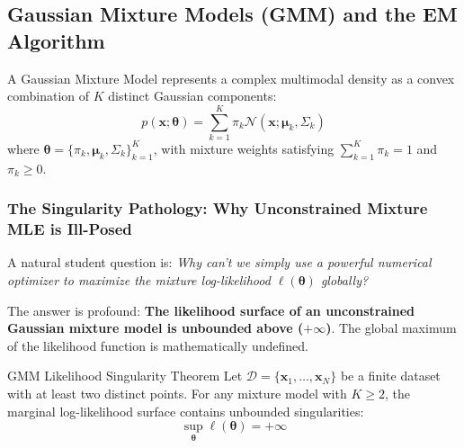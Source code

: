 \subsection{Gaussian Mixture Models (GMM) and the EM Algorithm}
A Gaussian Mixture Model represents a complex multimodal density as a convex combination of $K$ distinct Gaussian components:
\begin{equation}
p(\mathbf{x}; \boldsymbol{\theta}) = \sum_{k=1}^K \pi_k \mathcal{N}(\mathbf{x}; \boldsymbol{\mu}_k, \Sigma_k)
\label{eq:gmm_density}
\end{equation}
where $\boldsymbol{\theta} = \{\pi_k, \boldsymbol{\mu}_k, \Sigma_k\}_{k=1}^K$, with mixture weights satisfying $\sum_{k=1}^K \pi_k = 1$ and $\pi_k \ge 0$.

\subsubsection{The Singularity Pathology: Why Unconstrained Mixture MLE is Ill-Posed}
A natural student question is: \emph{Why can't we simply use a powerful numerical optimizer to maximize the mixture log-likelihood $\ell(\boldsymbol{\theta})$ globally?}

The answer is profound: \textbf{The likelihood surface of an unconstrained Gaussian mixture model is unbounded above ($+\infty$)}. The global maximum of the likelihood function is mathematically undefined.

\begin{theorembox}{GMM Likelihood Singularity Theorem}
Let $\mathcal{D} = \{\mathbf{x}_1, \dots, \mathbf{x}_N\}$ be a finite dataset with at least two distinct points. For any mixture model with $K \ge 2$, the marginal log-likelihood surface contains unbounded singularities:
\begin{equation}
\sup_{\boldsymbol{\theta}} \ell(\boldsymbol{\theta}) = +\infty
\end{equation}
\end{theorembox}

